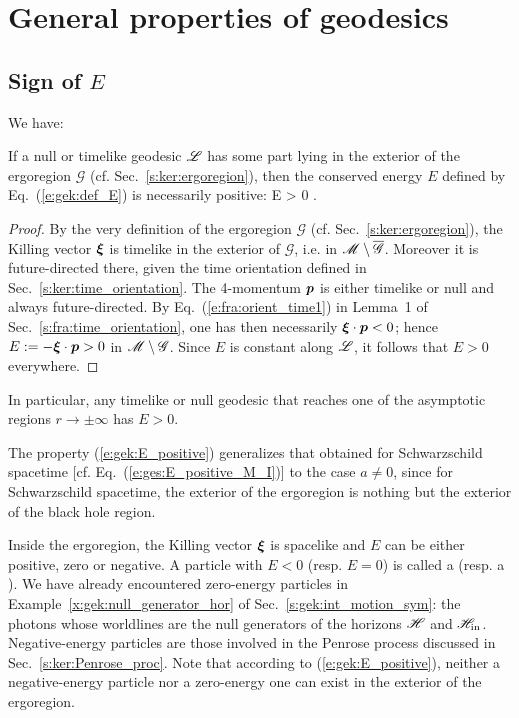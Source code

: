 \section{General properties of geodesics}

\subsection{Sign of $E$} \label{s:gek:sign_E}

We have:
\begin{greybox}
If a null or timelike geodesic $\mathscr{L}$ has some part lying in the exterior of the ergoregion $\mathscr{G}$ (cf. Sec.~\ref{s:ker:ergoregion}),
then the conserved energy $E$ defined by Eq.~(\ref{e:gek:def_E}) is necessarily
positive:
\be \label{e:gek:E_positive}
    \Li \not\subset {}\quad \Longrightarrow \quad E > 0 .
\ee
\end{greybox}
\begin{proof}
By the very definition of the ergoregion $\mathscr{G}$ (cf. Sec.~\ref{s:ker:ergoregion}),
the Killing vector $\bm{\xi}$ is timelike in the exterior of $\mathscr{G}$, i.e.
in $\mathscr{M}\setminus\overline{\mathscr{G}}$. Moreover it is
future-directed there, given the time orientation defined in Sec.~\ref{s:ker:time_orientation}.
The 4-momentum $\bm{p}$ is either timelike or null and always future-directed.
By Eq.~(\ref{e:fra:orient_time1}) in Lemma~1 of Sec.~\ref{s:fra:time_orientation}, one has then necessarily $\bm{\xi}\cdot\bm{p} < 0$; hence
$E := - \bm{\xi}\cdot\bm{p} > 0$ in $\mathscr{M}\setminus \mathscr{G}$. Since $E$ is constant along $\mathscr{L}$, it
follows that $E > 0$ everywhere.
\end{proof}
In particular, any timelike or null geodesic that reaches one of the asymptotic regions
$r\to\pm\infty$ has $E>0$.
\begin{remark}
The property (\ref{e:gek:E_positive}) generalizes that obtained for Schwarzschild spacetime [cf. Eq.~(\ref{e:ges:E_positive_M_I})] to
the case $a\not=0$, since for Schwarzschild spacetime, the exterior of the ergoregion
is nothing but the exterior of the black hole region.
\end{remark}

Inside the ergoregion, the Killing vector $\bm{\xi}$ is spacelike and $E$ can be
either positive, zero or negative.
A particle with $E<0$ (resp. $E=0$) is called a
(resp. a ).
We have already encountered zero-energy particles in Example~\ref{x:gek:null_generator_hor} of Sec.~\ref{s:gek:int_motion_sym}: the photons whose worldlines are the null generators of the horizons $\mathscr{H}$
and $\mathscr{H}_{\rm in}$.
Negative-energy particles are those involved in the Penrose process discussed in Sec.~\ref{s:ker:Penrose_proc}.
Note that according to (\ref{e:gek:E_positive}), neither a negative-energy particle nor a zero-energy one can exist in the exterior of the ergoregion.

